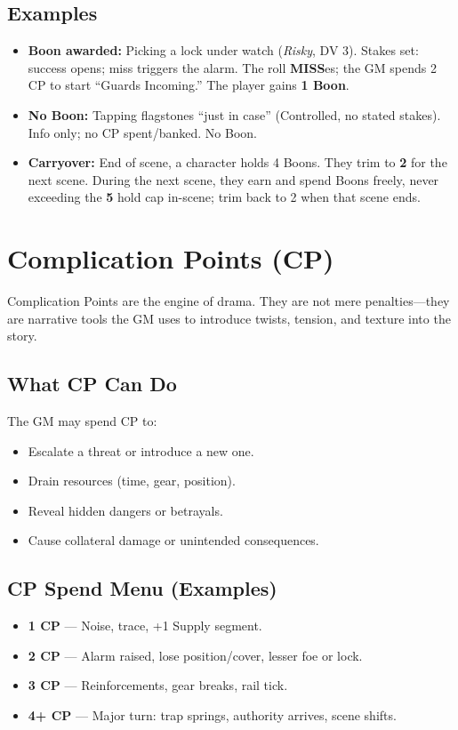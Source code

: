 \subsection*{Examples}
\begin{itemize}
  \item \textbf{Boon awarded:} Picking a lock under watch (\emph{Risky}, DV 3). Stakes set: success opens; miss triggers the alarm. The roll \textbf{MISS}es; the GM spends 2 CP to start ``Guards Incoming.'' The player gains \textbf{1 Boon}.
  \item \textbf{No Boon:} Tapping flagstones ``just in case'' (Controlled, no stated stakes). Info only; no CP spent/banked. No Boon.
  \item \textbf{Carryover:} End of scene, a character holds 4 Boons. They trim to \textbf{2} for the next scene. During the next scene, they earn and spend Boons freely, never exceeding the \textbf{5} hold cap in-scene; trim back to 2 when that scene ends.
\end{itemize}

\section{Complication Points (CP)}

Complication Points are the engine of drama. They are not mere penalties—they are narrative tools the GM uses to introduce twists, tension, and texture into the story.

\subsection*{What CP Can Do}

The GM may spend CP to:
\begin{itemize}
  \item Escalate a threat or introduce a new one.
  \item Drain resources (time, gear, position).
  \item Reveal hidden dangers or betrayals.
  \item Cause collateral damage or unintended consequences.
\end{itemize}

\subsection*{CP Spend Menu (Examples)}

\begin{itemize}
  \item \textbf{1 CP} — Noise, trace, +1 Supply segment.
  \item \textbf{2 CP} — Alarm raised, lose position/cover, lesser foe or lock.
  \item \textbf{3 CP} — Reinforcements, gear breaks, rail tick.
  \item \textbf{4+ CP} — Major turn: trap springs, authority arrives, scene shifts.
\end{itemize}

